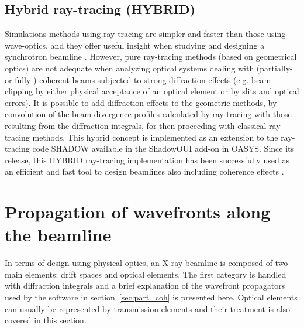 \documentclass{iucr}
\begin{document}
\subsection{Hybrid ray-tracing (HYBRID)}

Simulations methods using ray-tracing are simpler and faster than those using wave-optics, and they offer useful insight when studying and designing a synchrotron beamline \cite{hierarchical}. However, pure ray-tracing methods (based on geometrical optics) are not adequate when analyzing optical systems dealing with (partially- or fully-) coherent beams subjected to strong diffraction effects (e.g. beam clipping by either physical acceptance of an optical element or by slits and optical errors). It is possible to add diffraction effects to the geometric methods, by convolution of the beam divergence profiles calculated by ray-tracing with those resulting from the diffraction integrals, for then proceeding with classical ray-tracing methods. This hybrid concept \cite{codeHYBRID} is implemented as an extension to the ray-tracing code SHADOW \cite{codeSHADOW} available in the ShadowOUI \cite{codeSHADOWOUI} add-on in OASYS. Since its release, this HYBRID ray-tracing implementation has been successfully used as an efficient and fast tool to design beamlines also including coherence effects \cite{Shi2017,Luca2020, Lordano2022}.

\section{Propagation of wavefronts along the beamline\\}\label{sec:propagation}

 In terms of design using physical optics, an X-ray beamline is composed of two main elements: drift spaces and optical elements. The first category is handled with diffraction integrals and a brief explanation of the wavefront propagators used by the software in section~\ref{sec:part_coh} is presented here. Optical elements can usually be represented by transmission elements and their treatment is also covered in this section. 
\end{document}
